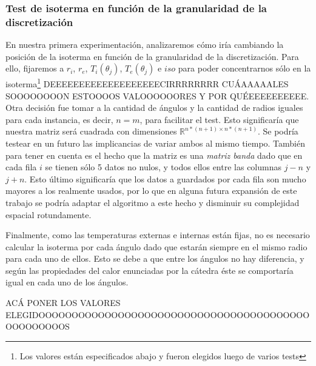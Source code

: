 \subsubsection{Test de isoterma en función de la granularidad de la discretización}

En nuestra primera experimentación, analizaremos cómo iría cambiando la posición de la isoterma en
función de la granularidad de la discretización. Para ello, fijaremos a $r_i$, $r_e$,
$T_i(\theta_j)$, $T_e(\theta_j)$ e $iso$ para poder concentrarnos sólo en la isoterma\footnote{Los
  valores están especificados abajo y fueron elegidos luego de varios tests}
  DEEEEEEEEEEEEEEEEEEECIRRRRRRRR CUÁAAAAALES SOOOOOOOON ESTOOOOS VALOOOOOORES Y POR QUÉEEEEEEEEEE.
Otra decisión fue tomar a la cantidad de ángulos y la cantidad de radios iguales para cada
instancia, es decir, $n=m$, para facilitar el test.  Esto significaría que nuestra matriz será
cuadrada con dimensiones $\mathbb{R}^{n*(n+1) \times n*(n+1)}$. Se podría testear en un futuro las
implicancias de variar ambos al mismo tiempo. También para tener en cuenta es el hecho que la matriz
es una \textit{matriz banda} dado que en cada fila $i$ se tienen sólo 5 datos no nulos, y todos
ellos entre las columnas $j-n$ y $j+n$. Esto último significaría que los datos a guardados por cada
fila son mucho mayores a los realmente usados, por lo que en alguna futura expansión de este trabajo
se podría adaptar el algoritmo a este hecho y disminuir su complejidad espacial rotundamente.

Finalmente, como las temperaturas externas e internas están fijas, no es necesario calcular la
isoterma por cada ángulo dado que estarán siempre en el mismo radio para cada uno de ellos. Esto se
debe a que entre los ángulos no hay diferencia, y según las propiedades del calor enunciadas por la
cátedra éste se comportaría igual en cada uno de los ángulos.


ACÁ PONER LOS VALORES ELEGIDOOOOOOOOOOOOOOOOOOOOOOOOOOOOOOOOOOOOOOOOOOOOOOOOOOS
